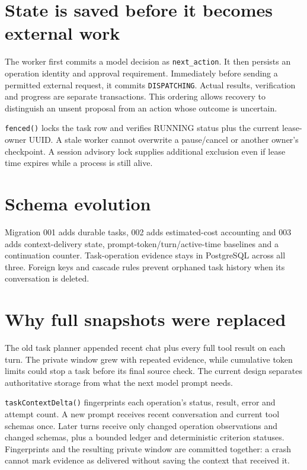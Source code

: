 \section*{State is saved before it becomes external work}
The worker first commits a model decision as \texttt{next\_action}. It then persists an operation identity and approval requirement. Immediately before sending a permitted external request, it commits \texttt{DISPATCHING}. Actual results, verification and progress are separate transactions. This ordering allows recovery to distinguish an unsent proposal from an action whose outcome is uncertain.

\texttt{fenced()} locks the task row and verifies RUNNING status plus the current lease-owner UUID. A stale worker cannot overwrite a pause/cancel or another owner's checkpoint. A session advisory lock supplies additional exclusion even if lease time expires while a process is still alive.
\section*{Schema evolution}
Migration 001 adds durable tasks, 002 adds estimated-cost accounting and 003 adds context-delivery state, prompt-token/turn/active-time baselines and a continuation counter. Task-operation evidence stays in PostgreSQL across all three. Foreign keys and cascade rules prevent orphaned task history when its conversation is deleted.
\section*{Why full snapshots were replaced}
The old task planner appended recent chat plus every full tool result on each turn. The private window grew with repeated evidence, while cumulative token limits could stop a task before its final source check. The current design separates authoritative storage from what the next model prompt needs.

\texttt{taskContextDelta()} fingerprints each operation's status, result, error and attempt count. A new prompt receives recent conversation and current tool schemas once. Later turns receive only changed operation observations and changed schemas, plus a bounded ledger and deterministic criterion statuses. Fingerprints and the resulting private window are committed together: a crash cannot mark evidence as delivered without saving the context that received it.
